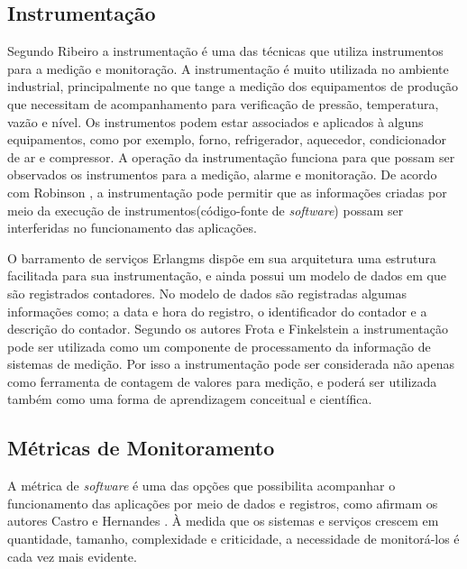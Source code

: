 
\subsection{Instrumentação}
\label{instrumentacao}
Segundo Ribeiro \cite{ribeiro1999instrumentaccao} a instrumentação é uma das técnicas que utiliza instrumentos para a medição e monitoração. A instrumentação é muito utilizada no ambiente industrial, principalmente no que tange a medição dos equipamentos de produção que necessitam de acompanhamento para verificação de pressão, temperatura, vazão e nível. Os instrumentos podem estar associados e
aplicados à alguns equipamentos, como por exemplo, forno, refrigerador,
aquecedor, condicionador de ar e compressor. A operação da instrumentação funciona para que possam ser observados os instrumentos para a medição, alarme e monitoração. De acordo com Robinson \cite{robinson2002monitoring}, a instrumentação pode permitir que as informações criadas por meio da execução de instrumentos(código-fonte de \textit{software}) possam ser interferidas no funcionamento das aplicações.

O barramento de serviços Erlangms dispõe em sua arquitetura uma estrutura facilitada para sua instrumentação, e ainda possui um modelo de dados em que são registrados contadores. No modelo de dados são registradas algumas informações como; a data e hora do registro, o identificador do contador e a descrição do contador.  
Segundo os autores Frota e Finkelstein \cite{frota2008educaccao} a instrumentação pode ser utilizada como um componente de processamento da informação de sistemas de medição. Por isso a instrumentação pode ser considerada não apenas como ferramenta de contagem de valores para medição, e poderá ser utilizada também como uma forma de aprendizagem conceitual e científica.  


\subsection{Métricas de Monitoramento}

A métrica de \textit{software} é uma das opções que possibilita acompanhar o funcionamento das aplicações por meio de dados e registros, como afirmam os autores Castro e Hernandes \cite{de2016metrica}. À medida que os sistemas e serviços crescem em quantidade, tamanho, complexidade e criticidade, a necessidade de monitorá-los é cada vez mais evidente. 

